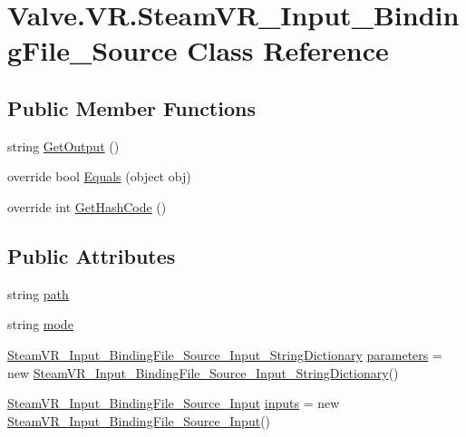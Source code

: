 \hypertarget{class_valve_1_1_v_r_1_1_steam_v_r___input___binding_file___source}{}\section{Valve.\+V\+R.\+Steam\+V\+R\+\_\+\+Input\+\_\+\+Binding\+File\+\_\+\+Source Class Reference}
\label{class_valve_1_1_v_r_1_1_steam_v_r___input___binding_file___source}
\subsection*{Public Member Functions}
\begin{DoxyCompactItemize}
\item 
string \mbox{\hyperlink{class_valve_1_1_v_r_1_1_steam_v_r___input___binding_file___source_a4db472a7504c576072a82cf5c23894a6}{Get\+Output}} ()
\item 
override bool \mbox{\hyperlink{class_valve_1_1_v_r_1_1_steam_v_r___input___binding_file___source_a782bce0af80d4dc3e3e492c9c84361ab}{Equals}} (object obj)
\item 
override int \mbox{\hyperlink{class_valve_1_1_v_r_1_1_steam_v_r___input___binding_file___source_a08cd8ab212d6975c344909e8f602b1e5}{Get\+Hash\+Code}} ()
\end{DoxyCompactItemize}
\subsection*{Public Attributes}
\begin{DoxyCompactItemize}
\item 
string \mbox{\hyperlink{class_valve_1_1_v_r_1_1_steam_v_r___input___binding_file___source_a0e59cbdd1285b38947c656efcf55b640}{path}}
\item 
string \mbox{\hyperlink{class_valve_1_1_v_r_1_1_steam_v_r___input___binding_file___source_a98896609e50ad7c9825db44b2c67b2cd}{mode}}
\item 
\mbox{\hyperlink{class_valve_1_1_v_r_1_1_steam_v_r___input___binding_file___source___input___string_dictionary}{Steam\+V\+R\+\_\+\+Input\+\_\+\+Binding\+File\+\_\+\+Source\+\_\+\+Input\+\_\+\+String\+Dictionary}} \mbox{\hyperlink{class_valve_1_1_v_r_1_1_steam_v_r___input___binding_file___source_ad8d0f8f04b66994a363669ffc56e1500}{parameters}} = new \mbox{\hyperlink{class_valve_1_1_v_r_1_1_steam_v_r___input___binding_file___source___input___string_dictionary}{Steam\+V\+R\+\_\+\+Input\+\_\+\+Binding\+File\+\_\+\+Source\+\_\+\+Input\+\_\+\+String\+Dictionary}}()
\item 
\mbox{\hyperlink{class_valve_1_1_v_r_1_1_steam_v_r___input___binding_file___source___input}{Steam\+V\+R\+\_\+\+Input\+\_\+\+Binding\+File\+\_\+\+Source\+\_\+\+Input}} \mbox{\hyperlink{class_valve_1_1_v_r_1_1_steam_v_r___input___binding_file___source_a5a70ce192dec4a33445721f0843f1642}{inputs}} = new \mbox{\hyperlink{class_valve_1_1_v_r_1_1_steam_v_r___input___binding_file___source___input}{Steam\+V\+R\+\_\+\+Input\+\_\+\+Binding\+File\+\_\+\+Source\+\_\+\+Input}}()
\end{DoxyCompactItemize}
